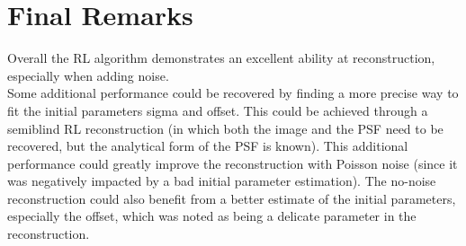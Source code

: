 \documentclass[a4paper]{article}
\begin{document}
	\vspace{0.035\textheight}

	\section{Final Remarks}
		Overall the RL algorithm demonstrates an excellent ability at reconstruction, especially when adding noise.\\
		
		Some additional performance could be recovered by finding a more precise way to fit the initial parameters sigma and offset. This could be achieved through a semiblind RL reconstruction (in which both the image and the PSF need to be recovered, but the analytical form of the PSF is known). This additional performance could greatly improve the reconstruction with Poisson noise (since it was negatively impacted by a bad initial parameter estimation). The no-noise reconstruction could also benefit from a better estimate of the initial parameters, especially the offset, which was noted as being a delicate parameter in the reconstruction.\\
		
	\newpage
\end{document}
